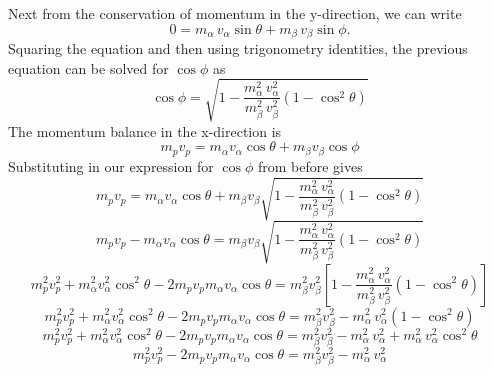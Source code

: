 \documentclass[../main.tex]{subfiles}
\begin{document}
Next from the conservation of momentum in the y-direction, we can write
\begin{equation}
  0 = m_{\alpha} \, v_{\alpha} \sin \theta + m_{\beta} \, v_{\beta} \sin \phi.
\end{equation}
Squaring the equation and then using trigonometry identities, the previous equation can be solved for $\cos \phi$ as
\begin{equation}
  \cos \phi = \sqrt{1 - \dfrac{m_{\alpha}^2 \, v_{\alpha}^2}{m_{\beta}^2 \, v_{\beta}^2} (1 - \cos^2 \theta)}
\end{equation}
The momentum balance in the x-direction is
\begin{equation}
  m_p v_p = m_{\alpha} v_{\alpha} \cos \theta + m_{\beta} v_{\beta} \cos \phi
\end{equation}
Substituting in our expression for $\cos \phi$ from before gives
\begin{equation}
  m_p v_p = m_{\alpha} v_{\alpha} \cos \theta + m_{\beta} v_{\beta} \sqrt{1 - \dfrac{m_{\alpha}^2 \, v_{\alpha}^2}{m_{\beta}^2 \, v_{\beta}^2} (1 - \cos^2 \theta)}
\end{equation}
\begin{equation}
  m_p v_p - m_{\alpha} v_{\alpha} \cos \theta =  m_{\beta} v_{\beta} \sqrt{1 - \dfrac{m_{\alpha}^2 \, v_{\alpha}^2}{m_{\beta}^2 \, v_{\beta}^2} (1 - \cos^2 \theta)}
\end{equation}
\begin{equation}
  m_p^2 v_p^2 + m_{\alpha}^2 v_{\alpha}^2 \cos^2 \theta - 2 m_p v_p m_{\alpha} v_{\alpha} \cos \theta =  m_{\beta}^2 v_{\beta}^2 \left[1 - \dfrac{m_{\alpha}^2 \, v_{\alpha}^2}{m_{\beta}^2 \, v_{\beta}^2} (1 - \cos^2 \theta)\right]
\end{equation}
\begin{equation}
  m_p^2 v_p^2 + m_{\alpha}^2 v_{\alpha}^2 \cos^2 \theta - 2 m_p v_p m_{\alpha} v_{\alpha} \cos \theta =  m_{\beta}^2 v_{\beta}^2 - m_{\alpha}^2 \, v_{\alpha}^2 (1 - \cos^2 \theta)
\end{equation}
\begin{equation}
  m_p^2 v_p^2 + m_{\alpha}^2 v_{\alpha}^2 \cos^2 \theta - 2 m_p v_p m_{\alpha} v_{\alpha} \cos \theta =  m_{\beta}^2 v_{\beta}^2 - m_{\alpha}^2 \, v_{\alpha}^2 + m_{\alpha}^2 \, v_{\alpha}^2 \cos^2 \theta
\end{equation}
\begin{equation}
  m_p^2 v_p^2 - 2 m_p v_p m_{\alpha} v_{\alpha} \cos \theta =  m_{\beta}^2 v_{\beta}^2 - m_{\alpha}^2 \, v_{\alpha}^2
\end{equation}
\end{document}
